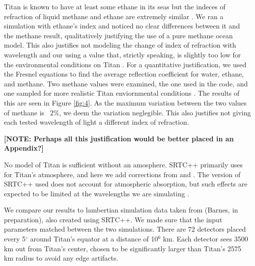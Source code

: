 \documentclass[twocolumn,linenumbers]{aastex631}
\begin{document}
Titan is known to have at least some ethane in its seas \citep{Mastrogiuseppe2016} but the indeces of refraction of liquid methane and ethane are extremely similar \citep{Kanjanasakul2020}. We ran a simulation with ethane's index and noticed no clear differences between it and the methane result, qualitatively justifying the use of a pure methane ocean model. This also justifies not modeling the change of index of refraction with wavelength and our using a value that, strictly speaking, is slightly too low for the environmental conditions on Titan \citep{Martonchik1994, Jennings2019}. For a quantitative justification, we used the Fresnel equations to find the average reflection coefficient for water, ethane, and methane. Two methane values were examined, the one used in the code, and one sampled for more realistic Titan enviornmental conditions \citep{Martonchik1994}. The results of this are seen in Figure \ref{fig:4}. As the maximum variation between the two values of methane is ~2\%, we deem the variation neglegible. This also justifies not giving each tested wavelength of light a different index of refraction.

\textbf{\color{red} [NOTE: Perhaps all this justification would be better placed in an Appendix?] \color{black}}

No model of Titan is sufficient without an amosphere. SRTC++ primarily uses \cite{Tomasko2008} for Titan's atmosphere, and here we add corrections from \cite{Hirtzig2013} and \cite{Rodriguez2018}. The version of SRTC++ used does not account for atmospheric absorption, but such effects are expected to be limited at the wavelengths we are simulating \citep{EsSayeh2023}.

We compare our results to lambertian simulation data taken from (Barnes, in preparation), also created using SRTC++. We made sure that the input parameters matched between the two simulations. There are 72 detectors placed every 5$^{\circ}$ around Titan's equator at a distance of 10$^6$ km. Each detector sees 3500 km out from Titan's center, chosen to be significantly larger than Titan's 2575 km radius to avoid any edge artifacts.
\end{document}
